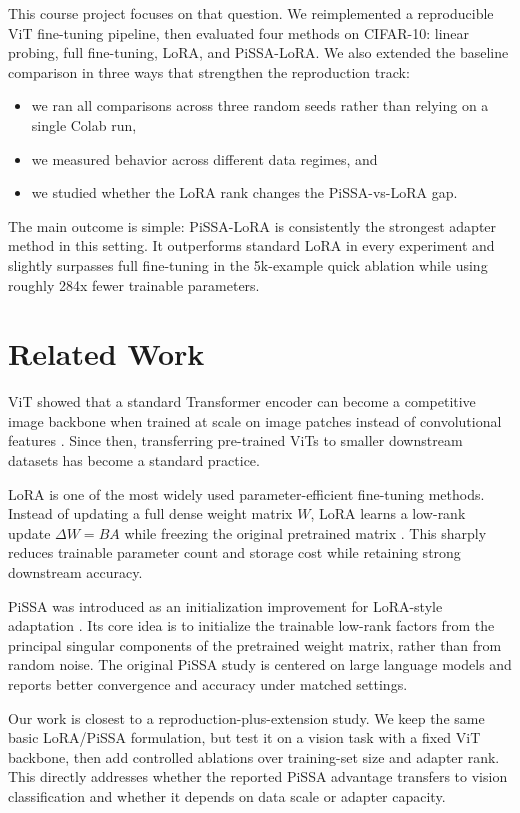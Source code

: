 \documentclass{article}
\begin{document}
This course project focuses on that question. We reimplemented a reproducible ViT fine-tuning pipeline, then evaluated four methods on CIFAR-10: linear probing, full fine-tuning, LoRA, and PiSSA-LoRA. We also extended the baseline comparison in three ways that strengthen the reproduction track:

\begin{itemize}
\item we ran all comparisons across three random seeds rather than relying on a single Colab run,
\item we measured behavior across different data regimes, and
\item we studied whether the LoRA rank changes the PiSSA-vs-LoRA gap.
\end{itemize}

The main outcome is simple: PiSSA-LoRA is consistently the strongest adapter method in this setting. It outperforms standard LoRA in every experiment and slightly surpasses full fine-tuning in the 5k-example quick ablation while using roughly 284x fewer trainable parameters.

\section{Related Work}

ViT showed that a standard Transformer encoder can become a competitive image backbone when trained at scale on image patches instead of convolutional features \citep{dosovitskiy2021vit}. Since then, transferring pre-trained ViTs to smaller downstream datasets has become a standard practice.

LoRA is one of the most widely used parameter-efficient fine-tuning methods. Instead of updating a full dense weight matrix $W$, LoRA learns a low-rank update $\Delta W = BA$ while freezing the original pretrained matrix \citep{hu2021lora}. This sharply reduces trainable parameter count and storage cost while retaining strong downstream accuracy.

PiSSA was introduced as an initialization improvement for LoRA-style adaptation \citep{meng2024pissa}. Its core idea is to initialize the trainable low-rank factors from the principal singular components of the pretrained weight matrix, rather than from random noise. The original PiSSA study is centered on large language models and reports better convergence and accuracy under matched settings.

Our work is closest to a reproduction-plus-extension study. We keep the same basic LoRA/PiSSA formulation, but test it on a vision task with a fixed ViT backbone, then add controlled ablations over training-set size and adapter rank. This directly addresses whether the reported PiSSA advantage transfers to vision classification and whether it depends on data scale or adapter capacity.
\end{document}

